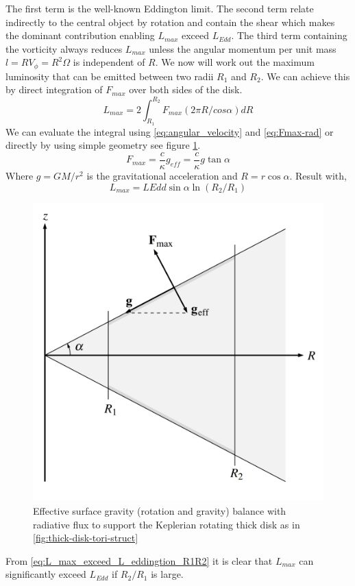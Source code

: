 \documentclass[a4paper,12pt,modern]{aastex62}
\begin{document}
The first term is the well-known Eddington limit.
The second term relate indirectly to the central object by rotation and contain the shear which makes the dominant contribution enabling $L_{max}$ exceed $L_{Edd}$. The third term containing the vorticity always reduces $L_{max}$ unless the angular momentum per unit mass $l=RV_\phi=R^2\Omega$ is independent of $R$.
We now will work out the maximum luminosity that can be emitted between two radii $R_1$ and $R_2$. We can achieve this by direct integration of $F_{max}$ over both sides of the disk.
\begin{equation}
    L_{max}=2\int_{R_1}^{R_2} F_{max} (2\pi R/cos\alpha) dR
\end{equation}
We can evaluate the integral using \ref{eq:angular_velocity} and \ref{eq:Fmax-rad} or directly by using simple geometry see figure \ref{fig:simple_geometry_geff_Lmax}.
\begin{equation}
    F_{max}=\frac{c}{\kappa} g_{eff} = \frac{c}{\kappa}g\tan\alpha
\end{equation}
Where $g=GM/r^2$ is the gravitational acceleration and $R=r\cos\alpha$.
Result with,
\begin{equation} \label{eq:L_max_exceed_L_eddingtion_R1R2}
    L_{max}=L{Edd}\sin\alpha \ln (R_2/R_1)
\end{equation}
\begin{figure}[ht!]
\includegraphics[width=\linewidth]{simple_geometry_geff_Lmax.png}
\caption{Effective surface gravity (rotation and gravity) balance with radiative flux to support the Keplerian rotating thick disk as in \ref{fig:thick-disk-tori-struct} }\label{fig:simple_geometry_geff_Lmax}
\end{figure}
From \ref{eq:L_max_exceed_L_eddingtion_R1R2} it is clear that $L_{max}$ can significantly exceed $L_{Edd}$ if $R_2/R_1$ is large. 
\end{document}
